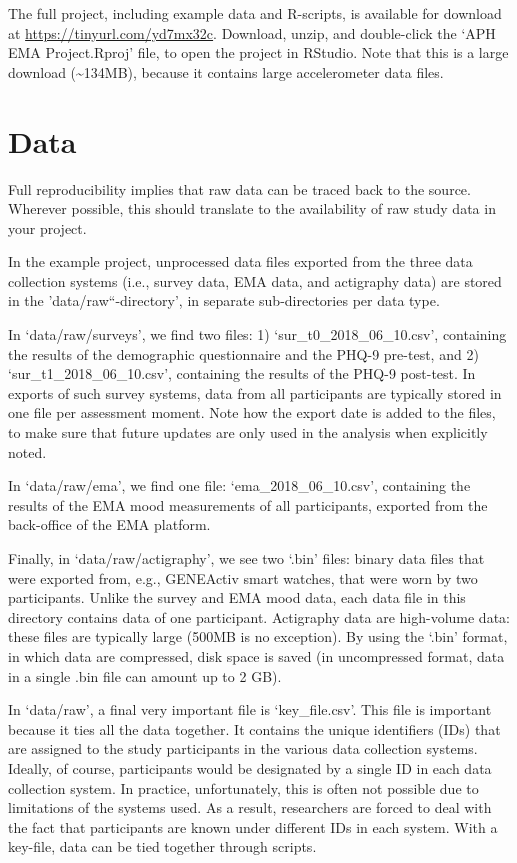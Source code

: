 \documentclass[]{book}
\begin{document}
The full project, including example data and R-scripts, is available for
download at \url{https://tinyurl.com/yd7mx32c}. Download, unzip, and
double-click the `APH EMA Project.Rproj' file, to open the project in
RStudio. Note that this is a large download (\textasciitilde{}134MB),
because it contains large accelerometer data files.

\section{Data}\label{data}


Full reproducibility implies that raw data can be traced back to the
source. Wherever possible, this should translate to the availability of
raw study data in your project.

In the example project, unprocessed data files exported from the three
data collection systems (i.e., survey data, EMA data, and actigraphy
data) are stored in the 'data/raw``-directory', in separate
sub-directories per data type.

In `data/raw/surveys', we find two files: 1)
`sur\_t0\_2018\_06\_10.csv', containing the results of the demographic
questionnaire and the PHQ-9 pre-test, and 2)
`sur\_t1\_2018\_06\_10.csv', containing the results of the PHQ-9
post-test. In exports of such survey systems, data from all participants
are typically stored in one file per assessment moment. Note how the
export date is added to the files, to make sure that future updates are
only used in the analysis when explicitly noted.

In `data/raw/ema', we find one file: `ema\_2018\_06\_10.csv', containing
the results of the EMA mood measurements of all participants, exported
from the back-office of the EMA platform.

Finally, in `data/raw/actigraphy', we see two `.bin' files: binary data
files that were exported from, e.g., GENEActiv smart watches, that were
worn by two participants. Unlike the survey and EMA mood data, each data
file in this directory contains data of one participant. Actigraphy data
are high-volume data: these files are typically large (500MB is no
exception). By using the `.bin' format, in which data are compressed,
disk space is saved (in uncompressed format, data in a single .bin file
can amount up to 2 GB).

In `data/raw', a final very important file is `key\_file.csv'. This file
is important because it ties all the data together. It contains the
unique identifiers (IDs) that are assigned to the study participants in
the various data collection systems. Ideally, of course, participants
would be designated by a single ID in each data collection system. In
practice, unfortunately, this is often not possible due to limitations
of the systems used. As a result, researchers are forced to deal with
the fact that participants are known under different IDs in each system.
With a key-file, data can be tied together through scripts.
\end{document}
